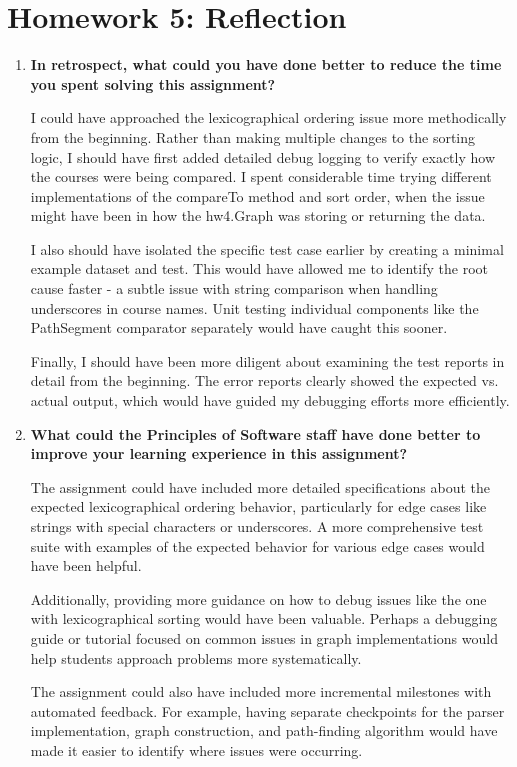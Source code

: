 \documentclass[11pt]{article}
\begin{document}
\section*{Homework 5: Reflection}

\begin{enumerate}
    \item \textbf{In retrospect, what could you have done better to reduce the time you spent solving this assignment?}
    
    I could have approached the lexicographical ordering issue more methodically from the beginning. Rather than making multiple changes to the sorting logic, I should have first added detailed debug logging to verify exactly how the courses were being compared. I spent considerable time trying different implementations of the compareTo method and sort order, when the issue might have been in how the hw4.Graph was storing or returning the data.
    
    I also should have isolated the specific test case earlier by creating a minimal example dataset and test. This would have allowed me to identify the root cause faster - a subtle issue with string comparison when handling underscores in course names. Unit testing individual components like the PathSegment comparator separately would have caught this sooner.
    
    Finally, I should have been more diligent about examining the test reports in detail from the beginning. The error reports clearly showed the expected vs. actual output, which would have guided my debugging efforts more efficiently.
    
    \item \textbf{What could the Principles of Software staff have done better to improve your learning experience in this assignment?}
    
    The assignment could have included more detailed specifications about the expected lexicographical ordering behavior, particularly for edge cases like strings with special characters or underscores. A more comprehensive test suite with examples of the expected behavior for various edge cases would have been helpful.
    
    Additionally, providing more guidance on how to debug issues like the one with lexicographical sorting would have been valuable. Perhaps a debugging guide or tutorial focused on common issues in graph implementations would help students approach problems more systematically.
    
    The assignment could also have included more incremental milestones with automated feedback. For example, having separate checkpoints for the parser implementation, graph construction, and path-finding algorithm would have made it easier to identify where issues were occurring.
    

\end{enumerate}
\end{document}
